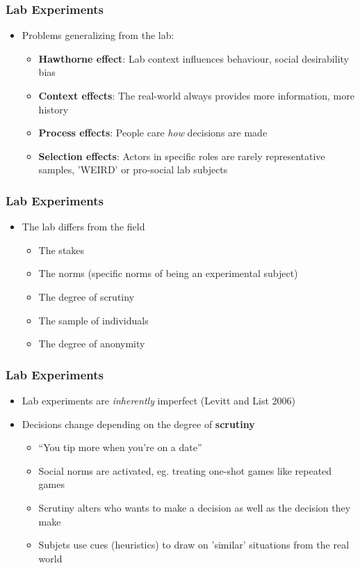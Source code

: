 \documentclass[xcolor=x11names,compress]{beamer}\usepackage[]{graphicx}\usepackage[]{color}
\renewcommand{\(}{\begin{columns}}
\renewcommand{\)}{\end{columns}}
\newcommand{\<}[1]{\begin{column}{#1}}
\renewcommand{\>}{\end{column}}
\begin{document}
\begin{frame}
\frametitle{Lab Experiments}
\begin{itemize}
\item Problems generalizing from the lab:
\pause
\begin{itemize}
\item \textbf{Hawthorne effect}: Lab context influences behaviour, social desirability bias
\pause
\item \textbf{Context effects}: The real-world always provides more information, more history
\pause
\item \textbf{Process effects}: People care \textit{how} decisions are made
\item \textbf{Selection effects}: Actors in specific roles are rarely representative samples, 'WEIRD' or pro-social lab subjects
\end{itemize}
\end{itemize}
\end{frame}

\begin{frame}
\frametitle{Lab Experiments}
\begin{itemize}
\item The lab differs from the field 
\pause
\begin{itemize}
\item The stakes
\pause
\item The norms (specific norms of being an experimental subject)
\pause
\item The degree of scrutiny
\pause
\item The sample of individuals
\pause
\item The degree of anonymity
\end{itemize}
\end{itemize}
\end{frame}

\begin{frame}
\frametitle{Lab Experiments}
\begin{itemize}
\item Lab experiments are \textit{inherently} imperfect (Levitt and List 2006)
\pause
\item Decisions change depending on the degree of \textbf{scrutiny}
\pause
\begin{itemize}
\item ``You tip more when you're on a date''
\pause
\item Social norms are activated, eg. treating one-shot games like repeated games
\pause
\item Scrutiny alters who wants to make a decision as well as the decision they make
\pause
\item Subjets use cues (heuristics) to draw on 'similar' situations from the real world
\end{itemize}
\end{itemize}
\end{frame}
\end{document}
